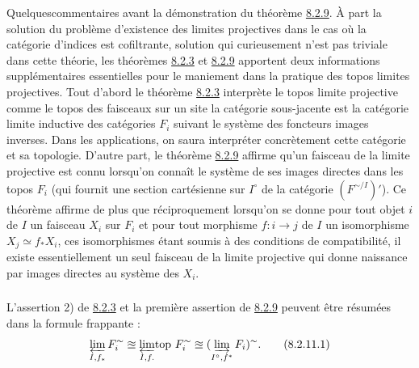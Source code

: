 \documentclass[10pt]{../fichiers-configuration-latex/smfart}
\begin{document}
Quelques\pageoriginale commentaires avant la démonstration du
théorème \hyperref[VI.thm8.2.9]{8.2.9}. À part la solution du problème
d'existence des limites projectives dans le cas où la catégorie
d'indices est cofiltrante, solution qui curieusement n'est pas
triviale dans cette théorie, les théorèmes \hyperref[VI.thm8.2.3]{8.2.3} et
\hyperref[VI.thm8.2.9]{8.2.9} apportent deux informations supplémentaires
essentielles pour le maniement dans la pratique des topos limites
projectives. Tout d'abord le théorème \hyperref[VI.thm8.2.3]{8.2.3} interprète
le topos limite projective comme le topos des faisceaux sur un site
 la catégorie sous-jacente est la catégorie limite inductive des
catégories $F_i$ suivant le système des foncteurs images inverses.
Dans les applications, on saura interpréter concrètement cette
catégorie et sa topologie. D'autre part, le théorème
\hyperref[VI.thm8.2.9]{8.2.9} affirme qu'un faisceau de la limite projective est
connu lorsqu'on connaît le système de ses images directes dans les
topos $F_i$ (qui fournit une section cartésienne sur $I^{\circ}$ de
la catégorie $(F^{\sim/I})'$). Ce théorème affirme de plus que
réciproquement lorsqu'on se donne pour tout objet $i$ de $I$ un
faisceau $X_i$ sur $F_i$ et pour tout morphisme $f : i \to j$ de $I$
un isomorphisme $X_j \simeq f_{\ast} X_i$, ces isomorphismes étant
soumis à des conditions de compatibilité, il existe essentiellement
un seul faisceau de la limite projective qui donne naissance par
images directes au système des $X_i$.

\subsubsection{}

L'assertion 2) de \hyperref[VI.thm8.2.3]{8.2.3} et la première assertion de \hyperref[VI.thm8.2.9]{8.2.9}
peuvent être résumées dans la formule frappante :
\begin{equation*}
\varprojlim_{I, f_{\ast}}F_i^{\sim} \approxeq
{\displaystyle{\varprojlim_{I, f.}\!\mbox{\rm top }}} F_i^{\sim} \approxeq
(\varinjlim_{I^{\circ}, f^{\ast}} F_i)^{\sim}{}. \tag{8.2.11.1}
\end{equation*}
\end{document}
